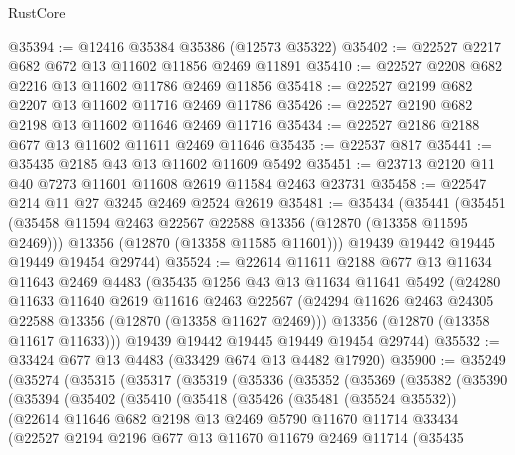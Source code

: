 \begin{lexlean}{RustCore}
\begin{coremodule}
@35394 := @12416 @35384 @35386 (@12573 @35322)
@35402 := @22527 @2217 @682 @672 @13 @11602 @11856 @2469 @11891
@35410 := @22527 @2208 @682 @2216 @13 @11602 @11786 @2469 @11856
@35418 := @22527 @2199 @682 @2207 @13 @11602 @11716 @2469 @11786
@35426 := @22527 @2190 @682 @2198 @13 @11602 @11646 @2469 @11716
@35434 := @22527 @2186 @2188 @677 @13 @11602 @11611 @2469 @11646
@35435 := @22537 @817
@35441 := @35435 @2185 @43 @13 @11602 @11609 @5492
@35451 := @23713 @2120 @11 @40 @7273 @11601 @11608 @2619 @11584 @2463 @23731
@35458 := @22547 @214 @11 @27 @3245 @2469 @2524 @2619
@35481 := @35434
    (@35441
      (@35451
        (@35458 @11594 @2463 @22567 @22588 @13356 (@12870 (@13358 @11595 @2469)))
        @13356
        (@12870 (@13358 @11585 @11601)))
      @19439
      @19442
      @19445
      @19449
      @19454
      @29744)
@35524 := @22614
    @11611
    @2188
    @677
    @13
    @11634
    @11643
    @2469
    @4483
    (@35435
      @1256
      @43
      @13
      @11634
      @11641
      @5492
      (@24280
        @11633
        @11640
        @2619
        @11616
        @2463
        @22567
        (@24294 @11626 @2463 @24305 @22588 @13356 (@12870 (@13358 @11627 @2469)))
        @13356
        (@12870 (@13358 @11617 @11633)))
      @19439
      @19442
      @19445
      @19449
      @19454
      @29744)
@35532 := @33424 @677 @13 @4483 (@33429 @674 @13 @4482 @17920)
@35900 := @35249
    (@35274
      (@35315
        (@35317
          (@35319
            (@35336
              (@35352
                (@35369
                  (@35382
                    (@35390
                      (@35394
                        (@35402
                          (@35410
                            (@35418
                              (@35426
                                (@35481 (@35524 @35532))
                                (@22614
                                  @11646
                                  @682
                                  @2198
                                  @13
                                  @2469
                                  @5790
                                  @11670
                                  @11714
                                  @33434
                                  (@22527
                                    @2194
                                    @2196
                                    @677
                                    @13
                                    @11670
                                    @11679
                                    @2469
                                    @11714
                                    (@35435

\end{coremodule}
\end{lexlean}
